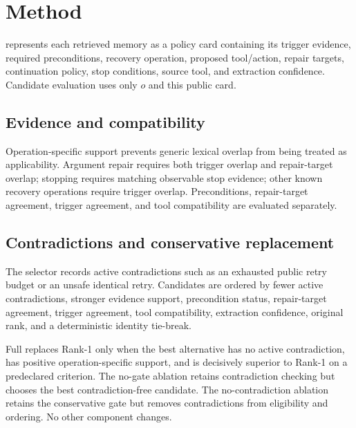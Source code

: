 \section{Method}

\proper{} represents each retrieved memory as a policy card containing its trigger evidence, required preconditions, recovery operation, proposed tool/action, repair targets, continuation policy, stop conditions, source tool, and extraction confidence. Candidate evaluation uses only $o$ and this public card.

\subsection{Evidence and compatibility}

Operation-specific support prevents generic lexical overlap from being treated as applicability. Argument repair requires both trigger overlap and repair-target overlap; stopping requires matching observable stop evidence; other known recovery operations require trigger overlap. Preconditions, repair-target agreement, trigger agreement, and tool compatibility are evaluated separately.

\subsection{Contradictions and conservative replacement}

The selector records active contradictions such as an exhausted public retry budget or an unsafe identical retry. Candidates are ordered by fewer active contradictions, stronger evidence support, precondition status, repair-target agreement, trigger agreement, tool compatibility, extraction confidence, original rank, and a deterministic identity tie-break.

Full \proper{} replaces Rank-1 only when the best alternative has no active contradiction, has positive operation-specific support, and is decisively superior to Rank-1 on a predeclared criterion. The no-gate ablation retains contradiction checking but chooses the best contradiction-free candidate. The no-contradiction ablation retains the conservative gate but removes contradictions from eligibility and ordering. No other component changes.
